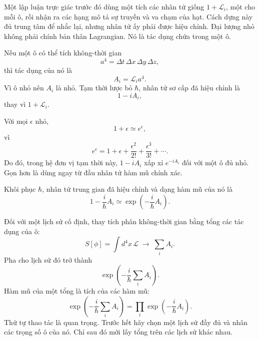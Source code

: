 Một lập luận trực giác trước đó dùng một tích các nhân tử giống \(1+\mathcal{L}_i\), một cho mỗi ô, rồi nhận ra các hạng mô tả sự truyền và va chạm của hạt. Cách dựng này đủ trung tâm để nhắc lại, nhưng nhân tử ấy phải được hiệu chỉnh. Đại lượng nhỏ không phải chính bản thân Lagrangian. Nó là tác dụng chứa trong một ô.

Nếu một ô có thể tích không-thời gian
\begin{equation}
a^4=\Delta t\,\Delta x\,\Delta y\,\Delta z,
\end{equation}
thì tác dụng của nó là
\begin{equation}
A_i=\mathcal{L}_i a^4.
\end{equation}
Vì ô nhỏ nên \(A_i\) là nhỏ. Tạm thời lược bỏ \(\hbar\), nhân tử sơ cấp đã hiệu chỉnh là
\begin{equation}
1-iA_i,
\end{equation}
thay vì \(1+\mathcal{L}_i\).

Với mọi \(\epsilon\) nhỏ,
\begin{equation}
1+\epsilon\simeq e^\epsilon,
\end{equation}
vì
\begin{equation}
e^\epsilon
=1+\epsilon+\frac{\epsilon^2}{2!}
+\frac{\epsilon^3}{3!}+\cdots.
\end{equation}
Do đó, trong hệ đơn vị tạm thời này, \(1-iA_i\) xấp xỉ \(e^{-iA_i}\) đối với một ô đủ nhỏ. Gọn hơn là dùng ngay từ đầu nhân tử hàm mũ chính xác.

\begin{classroomqa}
\end{classroomqa}

Khôi phục \(\hbar\), nhân tử trung gian đã hiệu chỉnh và dạng hàm mũ của nó là
\begin{equation}
1-\frac{i}{\hbar}A_i
\simeq
\exp\!\left(-\frac{i}{\hbar}A_i\right).
\end{equation}

Đối với một lịch sử cố định, thay tích phân không-thời gian bằng tổng các tác dụng của ô:
\begin{equation}
S[\phi]
=\int d^4x\,\mathcal{L}
\;\longrightarrow\;
\sum_i A_i.
\end{equation}
Pha cho lịch sử đó trở thành
\begin{equation}
\exp\!\left(-\frac{i}{\hbar}\sum_i A_i\right).
\end{equation}
Hàm mũ của một tổng là tích của các hàm mũ:
\begin{equation}
\exp\!\left(-\frac{i}{\hbar}\sum_i A_i\right)
=
\prod_i\exp\!\left(-\frac{i}{\hbar}A_i\right).
\end{equation}
Thứ tự thao tác là quan trọng. Trước hết hãy chọn một lịch sử đầy đủ và nhân các trọng số ô của nó. Chỉ sau đó mới lấy tổng trên các lịch sử khác nhau.


